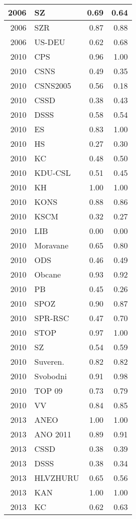 \begin{tabular}{r|l|r|r}
\hline
2006 & SZ & 0.69 & 0.64\\
\hline
2006 & SZR & 0.87 & 0.88\\
\hline
2006 & US-DEU & 0.62 & 0.68\\
\hline
2010 & CPS & 0.96 & 1.00\\
\hline
2010 & CSNS & 0.49 & 0.35\\
\hline
2010 & CSNS2005 & 0.56 & 0.18\\
\hline
2010 & CSSD & 0.38 & 0.43\\
\hline
2010 & DSSS & 0.58 & 0.54\\
\hline
2010 & ES & 0.83 & 1.00\\
\hline
2010 & HS & 0.27 & 0.30\\
\hline
2010 & KC & 0.48 & 0.50\\
\hline
2010 & KDU-CSL & 0.51 & 0.45\\
\hline
2010 & KH & 1.00 & 1.00\\
\hline
2010 & KONS & 0.88 & 0.86\\
\hline
2010 & KSCM & 0.32 & 0.27\\
\hline
2010 & LIB & 0.00 & 0.00\\
\hline
2010 & Moravane & 0.65 & 0.80\\
\hline
2010 & ODS & 0.46 & 0.49\\
\hline
2010 & Obcane & 0.93 & 0.92\\
\hline
2010 & PB & 0.45 & 0.26\\
\hline
2010 & SPOZ & 0.90 & 0.87\\
\hline
2010 & SPR-RSC & 0.47 & 0.70\\
\hline
2010 & STOP & 0.97 & 1.00\\
\hline
2010 & SZ & 0.54 & 0.59\\
\hline
2010 & Suveren. & 0.82 & 0.82\\
\hline
2010 & Svobodni & 0.91 & 0.98\\
\hline
2010 & TOP 09 & 0.73 & 0.79\\
\hline
2010 & VV & 0.84 & 0.85\\
\hline
2013 & ANEO & 1.00 & 1.00\\
\hline
2013 & ANO 2011 & 0.89 & 0.91\\
\hline
2013 & CSSD & 0.38 & 0.39\\
\hline
2013 & DSSS & 0.38 & 0.34\\
\hline
2013 & HLVZHURU & 0.65 & 0.56\\
\hline
2013 & KAN & 1.00 & 1.00\\
\hline
2013 & KC & 0.62 & 0.63\\

\end{tabular}
